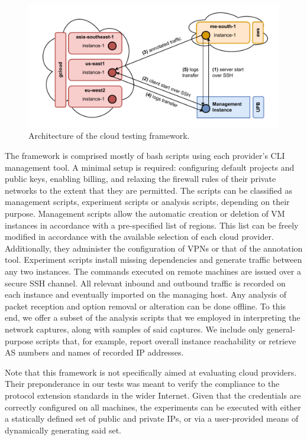 \begin{figure}[htb]
    \centering
    \includegraphics[width=\textwidth,keepaspectratio]{figures/architecture.pdf}
    \caption{Architecture of the cloud testing framework.}
    \label{extend:ops:fig:architecture}
\end{figure}

The framework is comprised mostly of bash scripts using each provider's CLI management tool. A minimal setup is required: configuring default projects and public keys, enabling billing, and relaxing the firewall rules of their private networks to the extent that they are permitted. The scripts can be classified as management scripts, experiment scripts or analysis scripts, depending on their purpose. Management scripts allow the automatic creation or deletion of VM instances in accordance with a pre-specified list of regions. This list can be freely modified in accordance with the available selection of each cloud provider. Additionally, they administer the configuration of VPNs or that of the annotation tool. Experiment scripts install missing dependencies and generate traffic between any two instances. The commands executed on remote machines are issued over a secure SSH channel. All relevant inbound and outbound traffic is recorded on each instance and eventually imported on the managing host. Any analysis of packet reception and option removal or alteration can be done offline. To this end, we offer a subset of the analysis scripts that we employed in interpreting the network captures, along with samples of said captures. We include only general-purpose scripts that, for example, report overall instance reachability or retrieve AS numbers and names of recorded IP addresses.

Note that this framework is not specifically aimed at evaluating cloud providers. Their preponderance in our tests was meant to verify the compliance to the protocol extension standards in the wider Internet. Given that the credentials are correctly configured on all machines, the experiments can be executed with either a statically defined set of public and private IPs, or via a user-provided means of dynamically generating said set.

